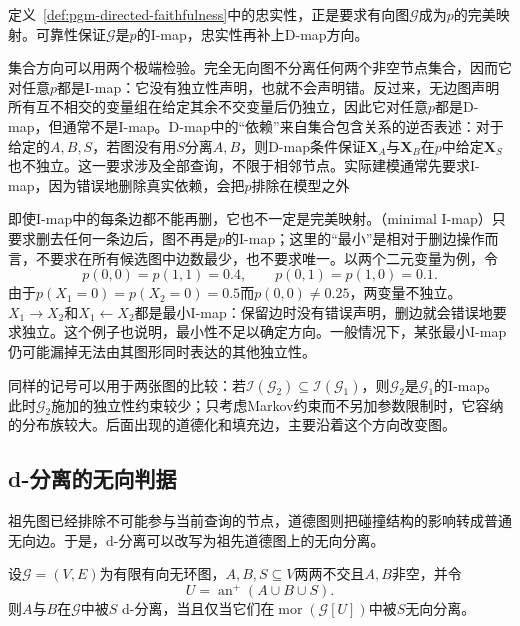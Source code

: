 定义~\ref{def:pgm-directed-faithfulness}中的忠实性，正是要求有向图$\mathcal{G}$成为$p$的完美映射。可靠性保证$\mathcal{G}$是$p$的I-map，忠实性再补上D-map方向。

集合方向可以用两个极端检验。完全无向图不分离任何两个非空节点集合，因而它对任意$p$都是I-map：它没有独立性声明，也就不会声明错。反过来，无边图声明所有互不相交的变量组在给定其余不交变量后仍独立，因此它对任意$p$都是D-map，但通常不是I-map。D-map中的“依赖”来自集合包含关系的逆否表述：对于给定的$A,B,S$，若图没有用$S$分离$A,B$，则D-map条件保证$\bm{X}_A$与$\bm{X}_B$在$p$中给定$\bm{X}_S$也不独立。这一要求涉及全部查询，不限于相邻节点。实际建模通常先要求I-map，因为错误地删除真实依赖，会把$p$排除在模型之外

即使I-map中的每条边都不能再删，它也不一定是完美映射。（minimal I-map）只要求删去任何一条边后，图不再是$p$的I-map；这里的“最小”是相对于删边操作而言，不要求在所有候选图中边数最少，也不要求唯一。以两个二元变量为例，令
\[
  p(0,0)=p(1,1)=0.4,\qquad
  p(0,1)=p(1,0)=0.1.
\]
由于$p(X_1=0)=p(X_2=0)=0.5$而$p(0,0)\ne0.25$，两变量不独立。$X_1\to X_2$和$X_1\leftarrow X_2$都是最小I-map：保留边时没有错误声明，删边就会错误地要求独立。这个例子也说明，最小性不足以确定方向。一般情况下，某张最小I-map仍可能漏掉无法由其图形同时表达的其他独立性。

同样的记号可以用于两张图的比较：若$\mathcal{I}(\mathcal{G}_2)\subseteq\mathcal{I}(\mathcal{G}_1)$，则$\mathcal{G}_2$是$\mathcal{G}_1$的I-map。此时$\mathcal{G}_2$施加的独立性约束较少；只考虑Markov约束而不另加参数限制时，它容纳的分布族较大。后面出现的道德化和填充边，主要沿着这个方向改变图。

\subsection{d-分离的无向判据}
\label{sec:pgm-representations-ancestral-moralization}

祖先图已经排除不可能参与当前查询的节点，道德图则把碰撞结构的影响转成普通无向边。于是，d-分离可以改写为祖先道德图上的无向分离。

\begin{theorem}[祖先道德化判据]
  \label{thm:pgm-representations-ancestral-moralization}
  设$\mathcal{G}=(V,E)$为有限有向无环图，$A,B,S\subseteq V$两两不交且$A,B$非空，并令
  \[
    U=\operatorname{an}^{+}(A\cup B\cup S).
  \]
  则$A$与$B$在$\mathcal{G}$中被$S$ d-分离，当且仅当它们在$\operatorname{mor}(\mathcal{G}[U])$中被$S$无向分离。
\end{theorem}

